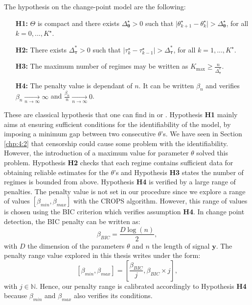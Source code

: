 The hypothesis on the change-point model are the following:  
\begin{itemize}
\item[\textbf{H1:}] $\Theta$ is compact and there exists $\Delta_{\bm \theta}^{\star}>0$ such that $\vert \theta_{k+1}^{\star}-\theta_{k}^{\star}\vert > \Delta_{\bm \theta}^{\star}$, for all $k=0,...,K^{\star}$.
\item[\textbf{H2:}] There exists $\Delta_{\bm \tau}^*>0$ such that $\vert \tau_{k}^{\star}-\tau_{k-1}^{\star}\vert > \Delta^*_{\bm \tau}$, for all $k=1,...,K^{\star}$.
\item[\textbf{H3:}]  The maximum number of regimes may be written as $K_{\max} \geq \frac{n}{\Delta^*_{\bm \tau}}$. 
\item[\textbf{H4:}] The penalty value is dependant of $n$. It can be written $\beta_{n}$ and verifies $\beta_{n}\xrightarrow[n\rightarrow \infty]{} \infty$ and $\frac{\beta_{n}}{n}\xrightarrow[n\rightarrow \infty]{} 0$.
\end{itemize}

These are classical hypothesis that one can find in \cite{Lavielle1997} or \cite{He2010}. Hypothesis \textbf{H1} mainly aims at ensuring sufficient conditions for the identifiability of the model, by imposing a minimum gap between two consecutive $\theta$'s. We have seen in Section \ref{chp:4:2} that censorship could cause some problem with the identifiability. However, the introduction of a maximum value for parameter $\theta$ solved this problem. Hypothesis \textbf{H2} checks that each regime contains sufficient data for obtaining reliable estimates for the $\theta$'s and Hypothesis \textbf{H3} states the number of regimes is bounded from above. Hypothesis \textbf{H4} is verified by a large range of penalties. The penalty value is not set in our procedure since we explore a range of values $[\beta_{min},\beta_{max}]$ with the CROPS algorithm. However, this range of values is chosen using the BIC criterion \citep{YAO1988181} which verifies assumption \textbf{H4}. In change point detection, the BIC penalty can be written as: 
$$\beta_{BIC} = \frac{D\log(n)}{2},$$
with $D$ the dimension of the parameters $\theta$ and $n$ the length of signal $\bm y$. The penalty range value explored in this thesis writes under the form: 
$$[\beta_{min},\beta_{max}] = [\frac{\beta_{BIC}}{j},\beta_{BIC}\times j],$$
with $j\in\mathbb{N}$. Hence, our penalty range is calibrated accordingly to Hypothesis \textbf{H4} because $\beta_{min}$ and $\beta_{max}$ also verifies its conditions.  

